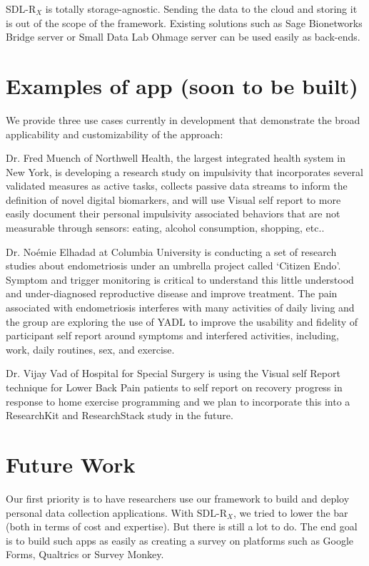 \documentclass{acm_proc_article-sp}
\newcommand{\sdlrx}{SDL-R$_X$}
\begin{document}
\sdlrx{} is totally storage-agnostic. Sending the data to the cloud and storing it is out of the scope of the framework. Existing solutions such as Sage Bionetworks Bridge server \cite{noauthor_undated-ax} or Small Data Lab Ohmage server \cite{Software_undated-mu} can be used easily as back-ends.

\section{Examples of app (soon to be built)}
We provide three use cases currently in development that demonstrate the broad applicability and customizability of the approach:

Dr. Fred Muench of Northwell Health, the largest integrated health system in New York, is developing a research study on impulsivity that incorporates several validated measures as active tasks, collects passive data streams to inform the definition of novel digital biomarkers, and will use Visual self report to more easily document their personal impulsivity associated behaviors that are not measurable through sensors: eating, alcohol consumption, shopping, etc..

Dr. No\'{e}mie Elhadad at Columbia University is conducting a set of research studies about endometriosis under an umbrella project called `Citizen Endo'. Symptom and trigger monitoring is critical to understand this little understood and under-diagnosed reproductive disease and improve treatment. The pain associated with endometriosis interferes with many activities of daily living and the group are exploring the use of YADL to improve the usability and fidelity of participant self report around symptoms and interfered activities, including, work, daily routines, sex, and exercise.

Dr. Vijay Vad of Hospital for Special Surgery  is using the Visual self Report technique for Lower Back Pain patients to self report on recovery progress in response to home exercise programming and we plan to incorporate this into a ResearchKit and ResearchStack study in the future.



\section{Future Work}
Our first priority is to have researchers use our framework to build and deploy personal data collection applications. With \sdlrx{}, we tried to lower the bar (both in terms of cost and expertise). But there is still a lot to do. The end goal is to build such apps as easily as creating a survey on platforms such as Google Forms, Qualtrics or Survey Monkey.
\end{document}
